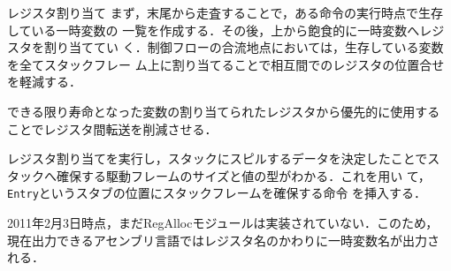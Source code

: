 \documentclass[a4paper,titlepage,report,disablejfam]{jsbook}
\begin{document}
\begin{resbonsiblesection}{レジスタ割り当て}{\kobori}\label{sc:impl-regalloc}
 まず，末尾から走査することで，ある命令の実行時点で生存している一時変数の
 一覧を作成する．その後，上から飽食的に一時変数へレジスタを割り当ててい
 く．制御フローの合流地点においては，生存している変数を全てスタックフレー
 ム上に割り当てることで相互間でのレジスタの位置合せを軽減する．

 できる限り寿命となった変数の割り当てられたレジスタから優先的に使用する
 ことでレジスタ間転送を削減させる．

 レジスタ割り当てを実行し，スタックにスピルするデータを決定したことでス
 タックへ確保する駆動フレームのサイズと値の型がわかる．これを用い
 て，\lstinline|Entry|というスタブの位置にスタックフレームを確保する命令
 を挿入する．

 2011年2月3日時点，まだRegAllocモジュールは実装されていない．このため，
 現在出力できるアセンブリ言語ではレジスタ名のかわりに一時変数名が出力さ
 れる．
\end{resbonsiblesection}
\end{document}
